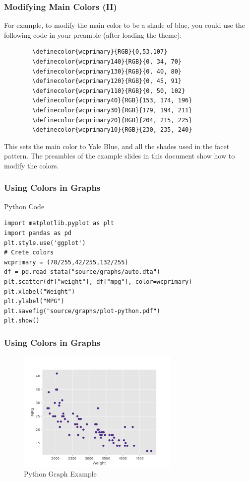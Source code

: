 \documentclass[aspectratio=1610]{beamer}
\begin{document}
\begin{frame}[fragile]
    \frametitle{Modifying Main Colors (II)}
    For example, to modify the main color to be a shade of blue, you could use the following code in your preamble (after loading the theme):
    \begin{verbatim}
        \definecolor{wcprimary}{RGB}{0,53,107}
        \definecolor{wcprimary140}{RGB}{0, 34, 70}
        \definecolor{wcprimary130}{RGB}{0, 40, 80}
        \definecolor{wcprimary120}{RGB}{0, 45, 91}
        \definecolor{wcprimary110}{RGB}{0, 50, 102}
        \definecolor{wcprimary40}{RGB}{153, 174, 196}
        \definecolor{wcprimary30}{RGB}{179, 194, 211}
        \definecolor{wcprimary20}{RGB}{204, 215, 225}
        \definecolor{wcprimary10}{RGB}{230, 235, 240}
    \end{verbatim}
    This sets the main color to Yale Blue, and all the shades used in the facet pattern. The preambles of the example slides in this document show how to modify the colors.
\end{frame}

\begin{frame}[fragile]
    \frametitle{Using Colors in Graphs}
    \begin{tblock}{Python Code}
        \footnotesize
        \begin{verbatim}
import matplotlib.pyplot as plt
import pandas as pd
plt.style.use('ggplot')
# Crete colors
wcprimary = (78/255,42/255,132/255)
df = pd.read_stata("source/graphs/auto.dta")
plt.scatter(df["weight"], df["mpg"], color=wcprimary)
plt.xlabel("Weight")
plt.ylabel("MPG")
plt.savefig("source/graphs/plot-python.pdf")
plt.show()
        \end{verbatim}
    \end{tblock}
\end{frame}

\begin{frame}[fragile]
    \frametitle{Using Colors in Graphs}
    \begin{figure}
        \centering
        \includegraphics[width=0.7\textwidth]{graphs/plot-python.pdf}
        \caption{Python Graph Example}
        \label{fig:graph-python}
    \end{figure}
\end{frame}
\end{document}

